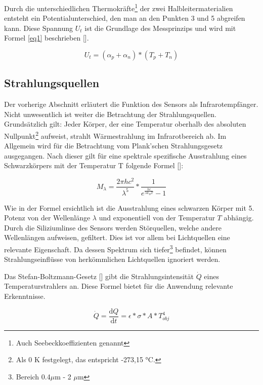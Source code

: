 Durch die unterschiedlichen Thermokräfte\footnote[3]{Auch Seebeckkoeffizienten genannt} der zwei Halbleitermaterialien entsteht ein Potentialunterschied, den man an den Punkten 3 und 5 abgreifen kann. Diese Spannung $U_{t}$ ist die Grundlage des Messprinzips und wird mit Formel \ref{eq1} beschrieben [\protect\cite{AMG8834}].

\begin{equation}
\label{eq1}
U_{t} = (\alpha_{p} + \alpha_{n})*(T_{p}+T_{n})
\end{equation}

\subsection{Strahlungsquellen}
\label{subsec:Strahlungstheorie}
Der vorherige Abschnitt erläutert die Funktion des Sensors als Infrarotempfänger. Nicht unwesentlich ist weiter die Betrachtung der Strahlungsquellen. Grundsätzlich gilt: Jeder Körper, der eine Temperatur oberhalb des absoluten Nullpunkt\footnote[3]{Als 0 K festgelegt, das entspricht -273,15 °C.} aufweist, strahlt Wärmestrahlung im Infrarotbereich ab. Im Allgemein wird für die Betrachtung vom Plank'schen Strahlungsgesetz ausgegangen. Nach dieser gilt für eine spektrale spezifische Ausstrahlung eines Schwarzkörpers mit der Temperatur T folgende Formel [\protect\cite{Thermoformeln}]: 

\begin{equation}
\label{eq2}
M_{\lambda } = \frac{2\pi h c^2 }{\lambda^5}*\frac{1}{e^\frac{hc}{\lambda k_{B} T}-1}
\end{equation}

Wie in der Formel ersichtlich ist die Ausstrahlung eines schwarzen Körper mit 5. Potenz von der Wellenlänge $\lambda$ und exponentiell von der Temperatur $T$ abhängig. Durch die Siliziumlinse des Sensors werden Störquellen, welche andere Wellenlängen aufweisen, gefiltert. Dies ist vor allem bei Lichtquellen eine relevante Eigenschaft. Da dessen Spektrum sich tiefer\footnote[4]{Bereich 0.4$ \mu$m - 2 $\mu$m} befindet, können Strahlungseinflüsse von herkömmlichen Lichtquellen ignoriert werden.

Das Stefan-Boltzmann-Gesetz [\protect\cite{Thermoformeln}] gibt die Strahlungsintensität $\dot{Q}$ eines Temperaturstrahlers an. Diese Formel bietet für die Anwendung relevante Erkenntnisse.

\begin{equation}
\label{eq3}
\dot{Q} = \frac{\mathrm{d} Q}{\mathrm{d} t} = \epsilon *\sigma * A * T_{obj}^4
\end{equation}

